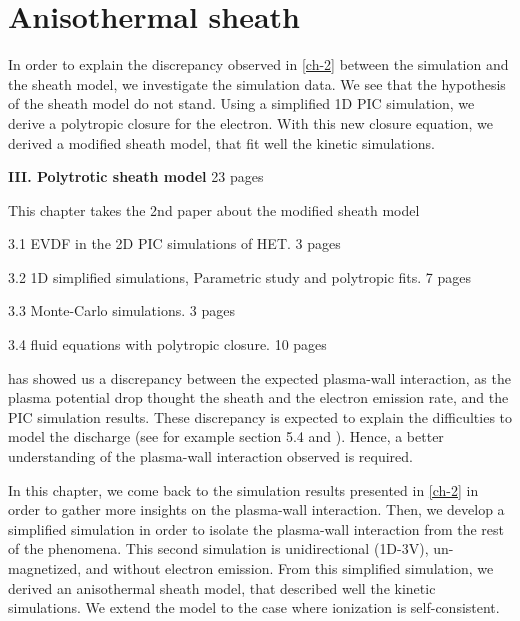 



\chapter{Anisothermal sheath}
\label{ch-3}

In order to explain the discrepancy observed in \cref{ch-2} between the simulation and the sheath model, we investigate the simulation data.
We see that the hypothesis of the sheath model do not stand.
Using a simplified \ac{1D} \ac{PIC} simulation, we derive a polytropic closure for the electron.
With this new closure equation, we derived a modified sheath model, that fit well the kinetic simulations. 


{\bf III. Polytrotic sheath model} 23 pages
\begin{zzz}
  This chapter takes the 2nd paper about the modified sheath model

  3.1 EVDF in the 2D PIC simulations of HET.    3 pages

  3.2 1D simplified simulations, Parametric study and polytropic fits. 7 pages

  3.3 Monte-Carlo simulations.  3 pages

  3.4 fluid equations with polytropic closure. 10 pages
\end{zzz}


\minitoc

 has showed us a discrepancy between the expected plasma-wall interaction, as the plasma potential drop thought the sheath and the electron emission rate, and the \ac{PIC} simulation results.
These discrepancy is expected to explain the difficulties to model the discharge (see for example \citet{croes2017} section 5.4 and \citet{raitses2011}).
Hence, a better understanding of the plasma-wall interaction observed is required.

In this chapter, we come back to the simulation results presented in \cref{ch-2}  in order to gather more insights on the plasma-wall interaction.
Then, we develop a simplified simulation in order to isolate the plasma-wall interaction from the rest of the phenomena.
This second simulation is unidirectional (\acs{1D}-\acs{3V}), un-magnetized, and without electron emission.
From this simplified simulation, we derived an anisothermal sheath model, that described well the kinetic simulations.
We extend the model to the case where ionization is self-consistent.





